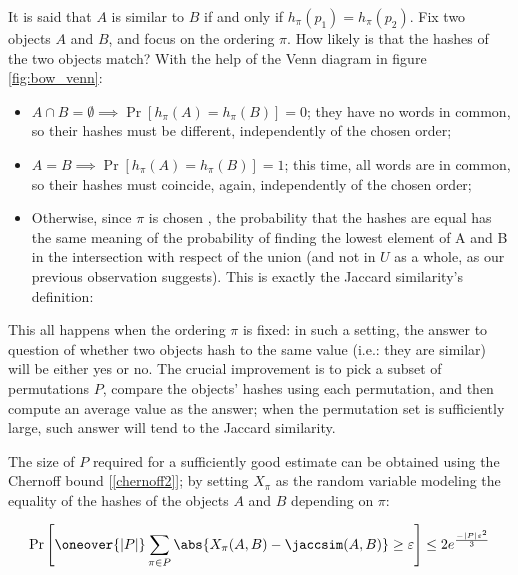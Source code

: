 It is said that $A$ is similar to $B$ if and only if $h_\pi(p_1) = h_\pi(p_2)$. Fix two objects $A$ and $B$, and focus on the ordering $\pi$. How likely is that the hashes of the two objects match? With the help of the Venn diagram in figure \ref{fig:bow_venn}:

\begin{itemize}
    \item $A \cap B = \emptyset \implies \Pr[h_\pi(A) = h_\pi(B)] = 0$; they have no words in common, so their hashes must be different, independently of the chosen order;
    \item $A = B \implies \Pr[h_\pi(A) = h_\pi(B)] = 1$; this time, all words are in common, so their hashes must coincide, again, independently of the chosen order;
    \item Otherwise, since $\pi$ is chosen \uar{}, the probability that the hashes are equal has the same meaning of the probability of finding the lowest element of A and B in the intersection with respect of the union (and not in $U$ as a whole, as our previous observation suggests). This is exactly the Jaccard similarity's definition:
\end{itemize}

This all happens when the ordering $\pi$ is fixed: in such a setting, the answer to question of whether two objects hash to the same value (i.e.: they are similar) will be either yes or no. The crucial improvement is to pick a subset of permutations $P$, compare the objects' hashes using each permutation, and then compute an average value as the answer; when the permutation set is sufficiently large, such answer will tend to the Jaccard similarity.

The size of $P$ required for a sufficiently good estimate can be obtained using the Chernoff bound [\ref{chernoff2}]; by setting $X_\pi$ as the random variable modeling the equality of the hashes of the objects $A$ and $B$ depending on $\pi$:

\begin{equation} \label{eq:lsh-chernoff}
    \Pr \left[ \oneover{|P|} \sum_{\pi \in P} \abs{X_\pi(A, B) - \jaccsim(A, B)} \geq \varepsilon \right] \leq 2e^{\frac{-|P| \varepsilon^2}{3}}
\end{equation}

